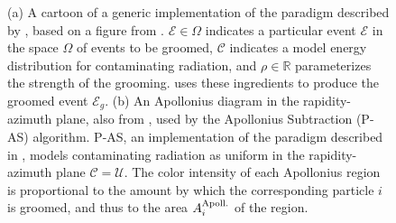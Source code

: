 \documentclass[letterpaper,11pt]{article}
\begin{document}
\begin{figure}[t!]
\centering

\caption{
    (a) A cartoon of a generic implementation of the \PIRANHA{} paradigm described by , based on a figure from .
    \(\mathcal{E} \in \Omega\) indicates a particular event \(\mathcal{E}\) in the space \(\Omega\) of events to be groomed, \(\mathcal{C}\) indicates a model energy distribution for contaminating radiation, and \(\rho\in \mathbb{R}\) parameterizes the strength of the grooming.
     uses these ingredients to produce the groomed event \(\mathcal{E}_g\).
    (b) An Apollonius diagram in the rapidity-azimuth plane, also from , used by the Apollonius Subtraction (P-AS) algorithm.
    P-AS, an implementation of the \PIRANHA{} paradigm described in , models contaminating radiation as uniform in the rapidity-azimuth plane \(\mathcal C = \mathcal U\).
    The color intensity of each Apollonius region is proportional to the amount by which the corresponding particle \(i\) is groomed, and thus to the area \(A^{\rm Apoll.}_i\) of the region.
}
\label{fig:as}
\end{figure}



\end{document}
